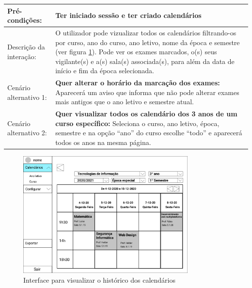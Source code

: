 \documentclass[11pt, twoside]{report}
\begin{document}
\begin{table}[H]
\begin{center}
\begin{tabularx}{\textwidth}{|l|X|}
				\hline
				Pré-condições:           & Ter iniciado sessão e ter criado calendários                                                                                                                                                                                                                                                                    \\
				\hline
				Descrição da interação: & O utilizador pode vizualizar todos os calendários filtrando-os por curso, ano do curso, ano letivo, nome da época e semestre (ver figura \ref{interfacehistorico}). Pode ver os exames marcados, o(s) seus vigilante(s) e a(s) sala(s) associada(s), para além da data de início e fim da época selecionada. \\
				\hline
				Cenário alternativo 1:     & \textbf{Quer alterar o horário da marcação dos exames:} Aparecerá um aviso que informa que não pode alterar exames mais antigos que o ano letivo e semestre atual.                                                                                                                                           \\
				\hline
				Cenário alternativo 2:     & \textbf{Quer visualizar todos os calendário dos 3 anos de um curso específico:} Seleciona o curso, ano letivo, época, semestre e na opção ``ano'' do curso escolhe ``todo'' e aparecerá todos os anos na mesma página.                                                                                     \\
				\hline
			\end{tabularx}
		\end{center}
	\end{table}
	
	\begin{figure}[H] 
		\centering 
		\includegraphics[width=0.8\textwidth,height=0.8\textheight,keepaspectratio]{image/prototipowireframes/calendariohistorico}
		\caption{Interface para visualizar o histórico dos calendários}
		\label{interfacehistorico}
	\end{figure}
	
\end{document}
